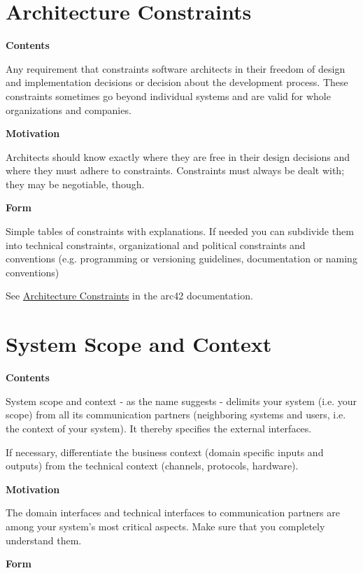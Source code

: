 \documentclass[
]{article}
\begin{document}
\hypertarget{section-architecture-constraints}{%
\section{Architecture
Constraints}\label{section-architecture-constraints}}

\textbf{Contents}

Any requirement that constraints software architects in their freedom of
design and implementation decisions or decision about the development
process. These constraints sometimes go beyond individual systems and
are valid for whole organizations and companies.

\textbf{Motivation}

Architects should know exactly where they are free in their design
decisions and where they must adhere to constraints. Constraints must
always be dealt with; they may be negotiable, though.

\textbf{Form}

Simple tables of constraints with explanations. If needed you can
subdivide them into technical constraints, organizational and political
constraints and conventions (e.g. programming or versioning guidelines,
documentation or naming conventions)

See \href{https://docs.arc42.org/section-2/}{Architecture Constraints}
in the arc42 documentation.

\hypertarget{section-system-scope-and-context}{%
\section{System Scope and
Context}\label{section-system-scope-and-context}}

\textbf{Contents}

System scope and context - as the name suggests - delimits your system
(i.e. your scope) from all its communication partners (neighboring
systems and users, i.e. the context of your system). It thereby
specifies the external interfaces.

If necessary, differentiate the business context (domain specific inputs
and outputs) from the technical context (channels, protocols, hardware).

\textbf{Motivation}

The domain interfaces and technical interfaces to communication partners
are among your system's most critical aspects. Make sure that you
completely understand them.

\textbf{Form}
\end{document}
